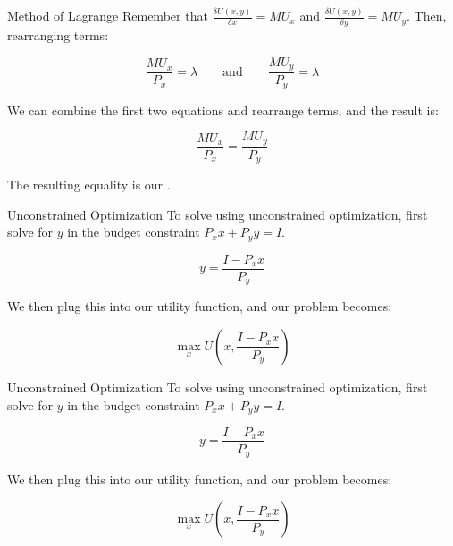 \documentclass[12pt,t]{beamer}
\begin{document}
\begin{frame}{Method of Lagrange}
  Remember that $\frac{\delta U(x,y)}{\delta x} = MU_x$ and $\frac{\delta U(x,y)}{\delta y} = MU_y$. Then, rearranging terms:

  $$
  \frac{MU_x}{P_x} = \lambda \qquad \text{and} \qquad \frac{MU_y}{P_y} = \lambda
  $$

  \pause\bigskip 
  We can combine the first two equations and rearrange terms, and the result is:

  $$
  \frac{MU_x}{P_x} = \frac{MU_y}{P_y}
  $$
  
  \pause\bigskip
  The resulting equality is our .
\end{frame}

\begin{frame}{Unconstrained Optimization}
  To solve using unconstrained optimization, first solve for $y$ in the budget constraint $P_x x + P_y y = I$.

  $$
    y  = \frac{I - P_x x}{P_y} 
  $$

  \pause\bigskip
  We then plug this into our utility function, and our problem becomes:

  $$
    \max_x U(x,\frac{I - P_x x}{P_y}) 
  $$
\end{frame}

\begin{frame}{Unconstrained Optimization}
  To solve using unconstrained optimization, first solve for $y$ in the budget constraint $P_x x + P_y y = I$.

  $$
    y  = \frac{I - P_x x}{P_y} 
  $$

  \pause\bigskip
  We then plug this into our utility function, and our problem becomes:

  $$
    \max_x U(x,\frac{I - P_x x}{P_y}) 
  $$
\end{frame}
\end{document}
